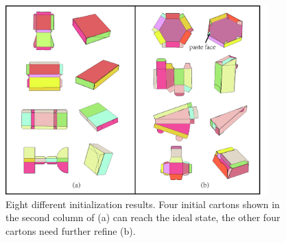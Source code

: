 \begin{figure}
	\centering
	\includegraphics[width=0.9\textwidth]{images/initial.jpg}
	\caption{Eight different initialization results. Four initial cartons shown in the second column of (a) can reach the ideal state, the other four cartons need further refine (b).}
	\label{fig:initial}
\end{figure}


